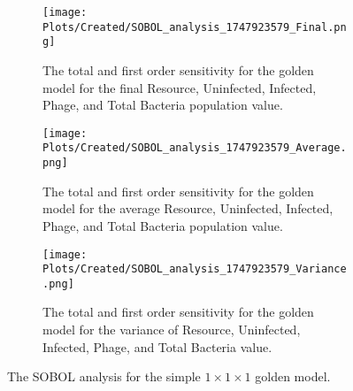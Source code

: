 \begin{figure}
    \centering
    \begin{subfigure}{0.49\linewidth}
        \centering
        \texttt{[image: Plots/Created/SOBOL\_analysis\_1747923579\_Final.png]}
        \caption{
            The total and first order sensitivity for the golden model for the final Resource, Uninfected, Infected, Phage, and Total Bacteria population value. 
        }
        \label{fig:created:SOBOL_final}
    \end{subfigure}
    \hfill
    \begin{subfigure}{0.49\linewidth}
        \centering
        \texttt{[image: Plots/Created/SOBOL\_analysis\_1747923579\_Average.png]}
        \caption{
            The total and first order sensitivity for the golden model for the average Resource, Uninfected, Infected, Phage, and Total Bacteria population value. 
        }
        \label{fig:created:SOBOL_average}
    \end{subfigure}
    \hfill
    \begin{subfigure}{0.49\linewidth}
        \centering
        \texttt{[image: Plots/Created/SOBOL\_analysis\_1747923579\_Variance.png]}
        \caption{
            The total and first order sensitivity for the golden model for the variance of Resource, Uninfected, Infected, Phage, and Total Bacteria value. 
        }
        \label{fig:created:SOBOL_variance}
    \end{subfigure}
    \caption{The SOBOL analysis for the simple $1\times 1 \times 1$ golden model. }
\end{figure}
